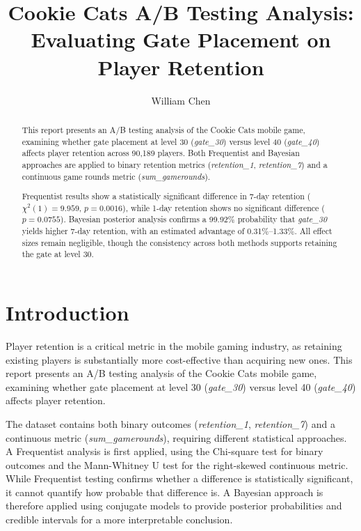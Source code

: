 \documentclass[12pt]{article}
\title{
    \vspace{-1cm}
    \Large\textbf{Cookie Cats A/B Testing Analysis:\\
    Evaluating Gate Placement on Player Retention}
}
\author{
    William Chen
}
\date{}
\begin{document}
\maketitle
\thispagestyle{empty}

\begin{abstract}
This report presents an A/B testing analysis of the Cookie Cats mobile game, 
examining whether gate placement at level 30 (\textit{gate\_30}) versus level 40 
(\textit{gate\_40}) affects player retention across 90,189 players. Both Frequentist 
and Bayesian approaches are applied to binary retention metrics (\textit{retention\_1}, 
\textit{retention\_7}) and a continuous game rounds metric (\textit{sum\_gamerounds}).

Frequentist results show a statistically significant difference in 7-day retention 
($\chi^2(1) = 9.959$, $p = 0.0016$), while 1-day retention shows no significant 
difference ($p = 0.0755$). Bayesian posterior analysis confirms a 99.92\% probability 
that \textit{gate\_30} yields higher 7-day retention, with an estimated advantage 
of 0.31\%--1.33\%. All effect sizes remain negligible, though the consistency across 
both methods supports retaining the gate at level 30.
\end{abstract}

\newpage

\section{Introduction}

Player retention is a critical metric in the mobile gaming industry, as retaining 
existing players is substantially more cost-effective than acquiring new ones. 
This report presents an A/B testing analysis of the Cookie Cats mobile game, 
examining whether gate placement at level 30 (\textit{gate\_30}) versus level 40 
(\textit{gate\_40}) affects player retention.

The dataset contains both binary outcomes (\textit{retention\_1}, \textit{retention\_7}) 
and a continuous metric (\textit{sum\_gamerounds}), requiring different statistical 
approaches. A Frequentist analysis is first applied, using the Chi-square test for 
binary outcomes and the Mann-Whitney U test for the right-skewed continuous metric. 
While Frequentist testing confirms whether a difference is statistically significant, 
it cannot quantify how probable that difference is. A Bayesian approach is therefore 
applied using conjugate models to provide posterior probabilities and credible 
intervals for a more interpretable conclusion.
\end{document}
